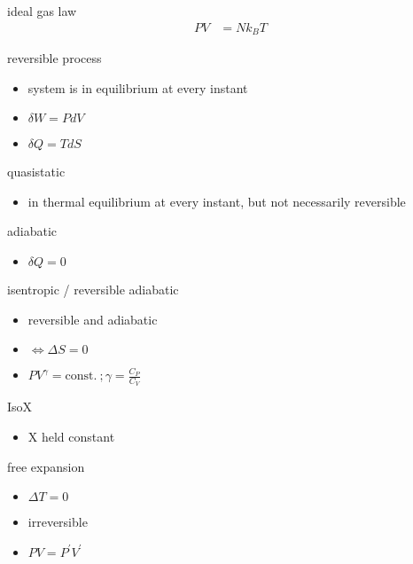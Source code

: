 \documentclass[avery5388, frame]{flashcards}
\begin{document}
\begin{flashcard}{ideal gas law}
  {
    \begin{align*}
      P V &= N k_{B} T
    \end{align*}
  }
\end{flashcard}

\begin{flashcard}{reversible process}
  \begin{itemize}
  \item system is in equilibrium at every instant
  \item $\delta W = P dV$
  \item $\delta Q = T dS$
  \end{itemize}
\end{flashcard}

\begin{flashcard}{quasistatic}
  \begin{itemize}
  \item in thermal equilibrium at every instant, but not necessarily reversible
  \end{itemize}
\end{flashcard}

\begin{flashcard}{adiabatic}
  \begin{itemize}
  \item $\delta Q = 0$
  \end{itemize}
\end{flashcard}

\begin{flashcard}{isentropic / reversible adiabatic}
  \begin{itemize}
  \item reversible and adiabatic
  \item $\iff \Delta S = 0$
  \item $PV^{\gamma} = \textrm{const.} \ ; \gamma = \frac{C_{P}}{C_{V}}$
  \end{itemize}
\end{flashcard}

\begin{flashcard}{IsoX}
  \begin{itemize}
  \item X held constant
  \end{itemize}
\end{flashcard}

\begin{flashcard}{free expansion}
  \begin{itemize}
  \item $\Delta T = 0$
  \item irreversible
  \item $P V = P^{'} V^{'}$
  \end{itemize}
\end{flashcard}
\end{document}
